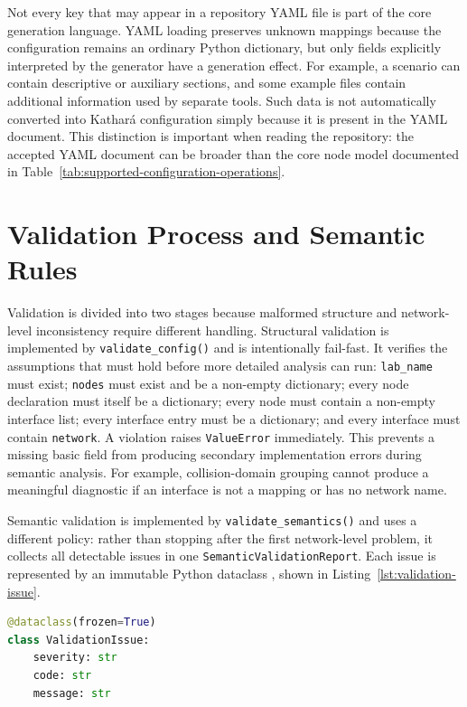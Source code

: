 Not every key that may appear in a repository YAML file is part of the core
generation language. YAML loading preserves unknown mappings because the
configuration remains an ordinary Python dictionary, but only fields
explicitly interpreted by the generator have a generation effect. For
example, a scenario can contain descriptive or auxiliary sections, and some
example files contain additional information used by separate tools. Such data
is not automatically converted into Kathar\'a configuration simply because it
is present in the YAML document. This distinction is important when reading
the repository: the accepted YAML document can be broader than the core node
model documented in Table~\ref{tab:supported-configuration-operations}.

\section{Validation Process and Semantic Rules}
\label{sec:structural-validation}

Validation is divided into two stages because malformed structure and
network-level inconsistency require different handling. Structural validation
is implemented by \texttt{validate\_config()} and is intentionally fail-fast.
It verifies the assumptions that must hold before more detailed analysis can
run: \texttt{lab\_name} must exist; \texttt{nodes} must exist and be a
non-empty dictionary; every node declaration must itself be a dictionary;
every node must contain a non-empty interface list; every interface entry must
be a dictionary; and every interface must contain \texttt{network}. A
violation raises \texttt{ValueError} immediately. This prevents a missing
basic field from producing secondary implementation errors during semantic
analysis. For example, collision-domain grouping cannot produce a meaningful
diagnostic if an interface is not a mapping or has no network name.

Semantic validation is implemented by \texttt{validate\_semantics()} and uses a
different policy: rather than stopping after the first network-level problem,
it collects all detectable issues in one \texttt{SemanticValidationReport}.
Each issue is represented by an immutable Python dataclass
\cite{python_dataclasses}, shown in Listing~\ref{lst:validation-issue}.

\begin{lstlisting}[language=Python,caption={Representation of a semantic validation issue.},label={lst:validation-issue}]
@dataclass(frozen=True)
class ValidationIssue:
    severity: str
    code: str
    message: str
\end{lstlisting}

